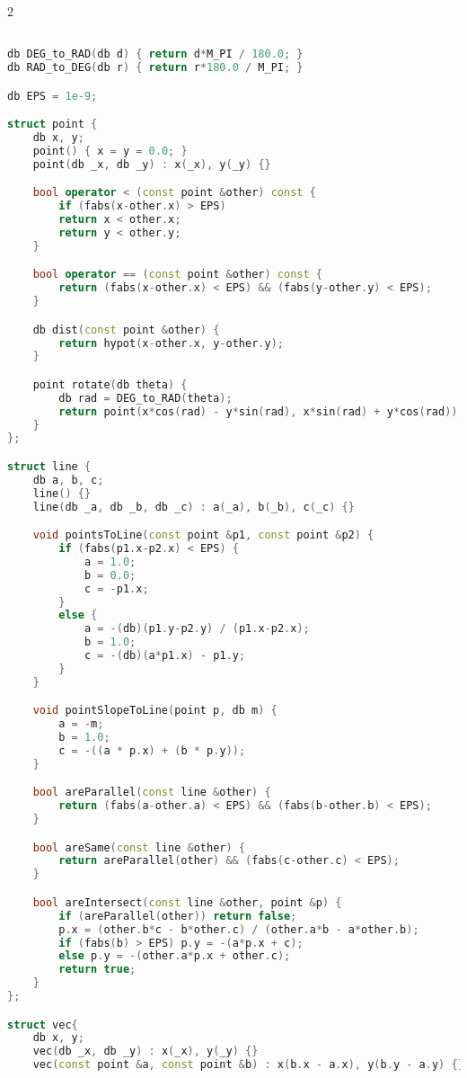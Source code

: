 \documentclass[leter]{amsart}
\begin{document}
\begin{multicols}{2}
\begin{lstlisting}[language=C++]

db DEG_to_RAD(db d) { return d*M_PI / 180.0; }
db RAD_to_DEG(db r) { return r*180.0 / M_PI; }

db EPS = 1e-9;

struct point {
    db x, y;
    point() { x = y = 0.0; }
    point(db _x, db _y) : x(_x), y(_y) {}

    bool operator < (const point &other) const { 
        if (fabs(x-other.x) > EPS) 
        return x < other.x;
        return y < other.y; 
    }

    bool operator == (const point &other) const {
        return (fabs(x-other.x) < EPS) && (fabs(y-other.y) < EPS);
    }

    db dist(const point &other) { 
        return hypot(x-other.x, y-other.y);
    }

    point rotate(db theta) { 
        db rad = DEG_to_RAD(theta);
        return point(x*cos(rad) - y*sin(rad), x*sin(rad) + y*cos(rad));
    }
};

struct line {
    db a, b, c;
    line() {}
    line(db _a, db _b, db _c) : a(_a), b(_b), c(_c) {}

    void pointsToLine(const point &p1, const point &p2) {
        if (fabs(p1.x-p2.x) < EPS) {
            a = 1.0;
            b = 0.0;
            c = -p1.x;
        }
        else {
            a = -(db)(p1.y-p2.y) / (p1.x-p2.x);
            b = 1.0;
            c = -(db)(a*p1.x) - p1.y;
        }
    }

    void pointSlopeToLine(point p, db m) {
        a = -m; 
        b = 1.0; 
        c = -((a * p.x) + (b * p.y)); 
    }

    bool areParallel(const line &other) {
        return (fabs(a-other.a) < EPS) && (fabs(b-other.b) < EPS);
    }

    bool areSame(const line &other) {
        return areParallel(other) && (fabs(c-other.c) < EPS);
    }

    bool areIntersect(const line &other, point &p) {
        if (areParallel(other)) return false;
        p.x = (other.b*c - b*other.c) / (other.a*b - a*other.b);
        if (fabs(b) > EPS) p.y = -(a*p.x + c);
        else p.y = -(other.a*p.x + other.c);
        return true;
    }
};

struct vec{
    db x, y;
    vec(db _x, db _y) : x(_x), y(_y) {}
    vec(const point &a, const point &b) : x(b.x - a.x), y(b.y - a.y) {}


\end{lstlisting}
\end{multicols}
\end{document}
